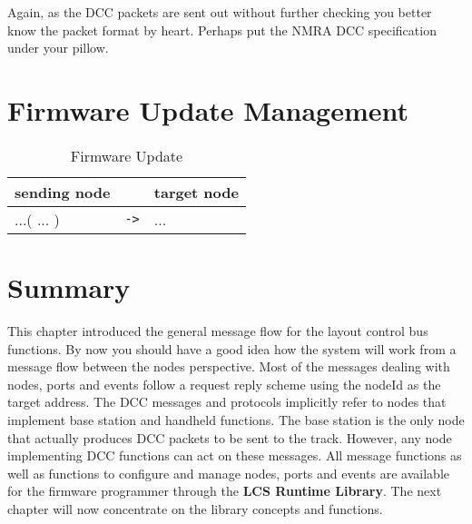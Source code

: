 Again, as the DCC packets are sent out without further checking you better know the packet format by heart. Perhaps put the NMRA DCC specification under your pillow.

\section{Firmware Update Management}

\begin{table}[ht!]
    \begin{center}
        \caption{Firmware Update}
        \begin{tabular}{|p{}| c |p{}|}
            \toprule
            \textbf{sending node} & & \textbf{ target node} \\
            \midrule
            ...( ... ) & \texttt{->} & ... \\
            \bottomrule
        \end{tabular}
    \end{center}
\end{table}

\section{Summary}

This chapter introduced the general message flow for the layout control bus functions. By now you should have a good idea how the system will work from a message flow between the nodes perspective. Most of the messages dealing with nodes, ports and events follow a request reply scheme using the nodeId as the target address. The DCC messages and protocols implicitly refer to nodes that implement base station and handheld functions. The base station is the only node that actually produces DCC packets to be sent to the track. However, any node implementing DCC functions can act on these messages. All message functions as well as functions to configure and manage nodes, ports and events are available for the firmware programmer through the \textbf{LCS Runtime Library}. The next chapter will now concentrate on the library concepts and functions.

